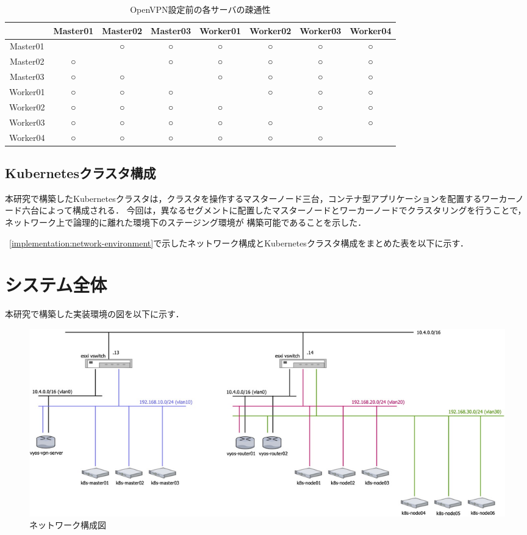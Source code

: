 \begin{table}[htb]
  \begin{center}
    \caption{OpenVPN設定前の各サーバの疎通性}
    \begin{tabular}{|c|c|c|c|c|c|c|c|} \hline
      & Master01 & Master02 & Master03 & Worker01 & Worker02 & Worker03 & Worker04 \\ \hline
      Master01 & \ & ○ & ○ & ○ & ○ & ○ & ○ \\ \hline
      Master02 & ○ & \ & ○ & ○ & ○ & ○ & ○ \\ \hline
      Master03 & ○ & ○ & \ & ○ & ○ & ○ & ○ \\ \hline
      Worker01 & ○ & ○ & ○ & \ & ○ & ○ & ○ \\ \hline
      Worker02 & ○ & ○ & ○ & ○ & \ & ○ & ○ \\ \hline
      Worker03 & ○ & ○ & ○ & ○ & ○ & \ & ○ \\ \hline
      Worker04 & ○ & ○ & ○ & ○ & ○ & ○ & \ \\ \hline
    \end{tabular}
  \end{center}
\end{table}

\subsection{Kubernetesクラスタ構成}
\label{implementation:kubernetes-environment}
本研究で構築したKubernetesクラスタは，クラスタを操作するマスターノード三台，コンテナ型アプリケーションを配置するワーカーノード六台によって構成される．
今回は，異なるセグメントに配置したマスターノードとワーカーノードでクラスタリングを行うことで，ネットワーク上で論理的に離れた環境下のステージング環境が
構築可能であることを示した．

~\ref{implementation:network-environment}で示したネットワーク構成とKubernetesクラスタ構成をまとめた表を以下に示す．

\section{システム全体}
\label{implementation:system}
本研究で構築した実装環境の図を以下に示す．

\begin{figure}[htbp]
  \begin{center}
    \includegraphics[width=\textwidth]{./figures/network-diagram.jpg}
    \caption{ネットワーク構成図}
  \end{center}
\end{figure}

